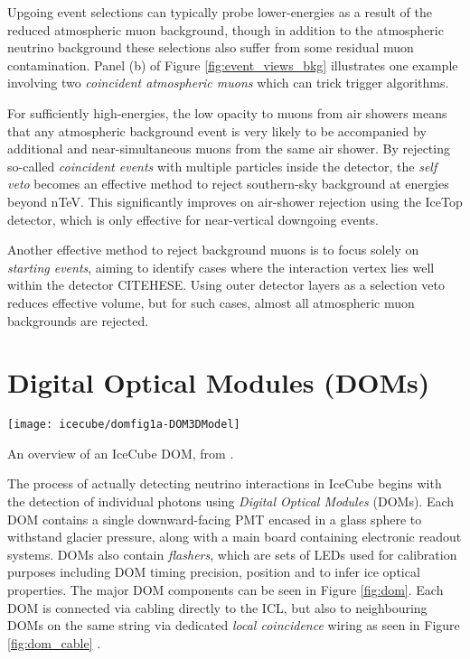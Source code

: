 Upgoing event selections can typically probe lower-energies as a result of the reduced atmospheric muon background, though in addition to the atmospheric neutrino background these selections also suffer from some residual muon contamination. Panel (b) of Figure \ref{fig:event_views_bkg} illustrates one example involving two \emph{coincident atmospheric muons} which can trick trigger algorithms.


For sufficiently high-energies, the low opacity to muons from air showers means that any atmospheric background event is very likely to be accompanied by additional and near-simultaneous muons from the same air shower. By rejecting so-called \emph{coincident events} with multiple particles inside the detector, the \emph{self veto} becomes an effective method to reject southern-sky background at energies beyond nTeV. This significantly improves on air-shower rejection using the IceTop detector, which is only effective for near-vertical downgoing events.

Another effective method to reject background muons is to focus solely on \emph{starting events}, aiming to identify cases where the interaction vertex lies well within the detector CITEHESE. Using outer detector layers as a selection veto reduces effective volume, but for such cases, almost all atmospheric muon backgrounds are rejected. 

\section{Digital Optical Modules (DOMs)}

\begin{marginfigure}
	\centering \texttt{[image: icecube/domfig1a-DOM3DModel]}
	\caption{An overview of an IceCube DOM, from \cite{icecube_detector_17}.}
	\label{fig:dom}
\end{marginfigure} 

The process of actually detecting neutrino interactions in IceCube begins with the detection of individual photons using \emph{Digital Optical Modules} (DOMs). Each DOM contains a single downward-facing PMT encased in a glass sphere to withstand glacier pressure, along with a main board containing electronic readout systems. DOMs also contain \emph{flashers}, which are sets of LEDs used for calibration purposes including DOM timing precision, position and to infer ice optical properties. The major DOM components can be seen in Figure \ref{fig:dom}. Each DOM is connected via cabling directly to the ICL, but also to neighbouring DOMs on the same string via dedicated \emph{local coincidence} wiring as seen in Figure \ref{fig:dom_cable} \cite{icecube_detector_17}.

